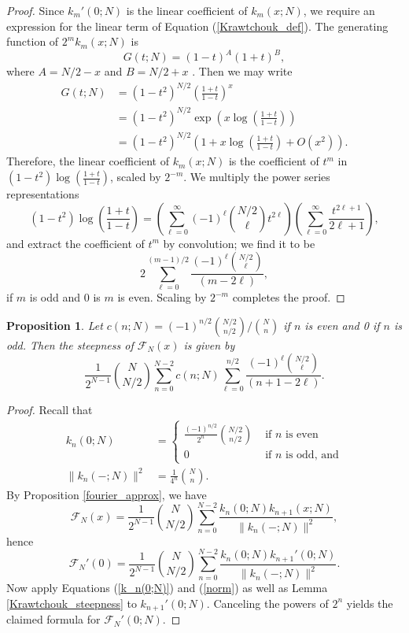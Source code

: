 \documentclass{amsart}
\theoremstyle{plain}
\newtheorem{prop}[equation]{Proposition}
\theoremstyle{remark}
\begin{document}
\begin{proof}
Since $k_m'(0;N)$ is the linear coefficient of $k_m(x;N)$, we require an expression for the linear term of Equation  (\ref{Krawtchouk_def}).  The generating function of $2^m k_m(x;N)$ is 
\[
G(t;N) = (1-t)^A(1+t)^B,
\]
where $A = N/2 - x$ and $B = N/2 + x$ \cite[(2.82.4)]{szego}. Then we may write
\begin{align*}
G(t;N) &= (1-t^2)^{N/2} \left( \frac{1+t}{1-t} \right)^x \\
&= (1-t^2)^{N/2} \exp \left(x \log \left( \frac{1+t}{1-t} \right) \right) \\
&= (1-t^2)^{N/2} \left(1 + x \log \left( \frac{1+t}{1-t} \right) + O(x^2)\right). 
\end{align*}
Therefore, the linear coefficient of $k_m(x;N)$ is the coefficient of $t^m$ in $(1-t^2)  \log \left( \frac{1+t}{1-t} \right)$, scaled by $2^{-m}$.  We multiply the power series representations
\[
(1-t^2)  \log \left( \frac{1+t}{1-t} \right) = \left( \sum_{\ell=0}^\infty (-1)^{\ell} \binom{N/2}{\ell} t^{2\ell} \right) \left( \sum_{\ell=0}^\infty \frac{t^{2\ell+1}}{2\ell+1} \right),
\]
and extract the coefficient of $t^m$ by convolution; we find it to be 
\[
2\sum_{\ell = 0}^{(m-1)/2} \frac{(-1)^\ell  \binom{N/2}{\ell}}{(m-2\ell)},
\]
if $m$ is odd and $0$ is $m$ is even.  Scaling by $2^{-m}$ completes the proof.
\end{proof}

\begin{prop} \label{exact_steepness_formula}
Let $c(n;N) = (-1)^{n/2} \binom{N/2}{n/2} / \binom{N}{n}$ if $n$ is even and 0 if $n$ is odd.  Then the steepness of  $\mathcal{F}_N(x)$ is given by
\[
\frac{1}{2^{N-1}} \binom{N}{N/2} \sum_{n=0}^{N-2} c(n;N) \sum_{\ell = 0}^{n/2} \frac{(-1)^\ell  \binom{N/2}{\ell}}{(n+1-2\ell)}.
\]
\end{prop}

\begin{proof}
Recall that 
\begin{align}
k_n(0;N) &= \begin{cases} \frac{(-1)^{n/2}}{2^n} \binom{N/2}{n/2} & \text{ if $n$ is even} \\
0& \text{ if $n$ is odd, and} 
\end{cases}  \label{k_n(0;N)}\\
\| k_n(-;N)\|^2 &= \frac{1}{4^n} \binom{N}{n}. \label{norm}
\end{align}
By Proposition \ref{fourier_approx}, we have
\[
\mathcal{F}_N(x) = \frac{1}{2^{N-1}} \binom{N}{N/2} \sum_{n=0}^{N-2} \frac{k_{n}(0;N) k_{n+1}(x;N)}{\| k_{n}(-;N) \|^2},
\]
hence
\[
\mathcal{F}_N'(0) = \frac{1}{2^{N-1}} \binom{N}{N/2} \sum_{n=0}^{N-2} \frac{k_{n}(0;N) k_{n+1}'(0;N)}{\| k_{n}(-;N) \|^2}.
\]
Now apply Equations (\ref{k_n(0;N)}) and (\ref{norm}) as well as Lemma \ref{Krawtchouk_steepness} to $k_{n+1}'(0;N)$.  Canceling the powers of $2^n$  yields the claimed formula for $\mathcal{F}_N'(0;N)$.
\end{proof}
\end{document}
